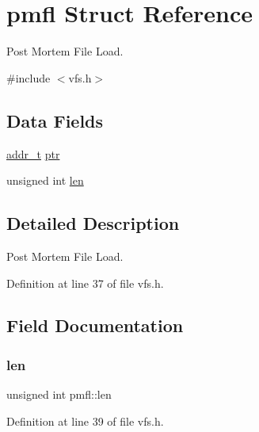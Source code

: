 \hypertarget{a00310}{}\section{pmfl Struct Reference}
\label{a00310}


Post Mortem File Load.  




{\ttfamily \#include $<$vfs.\+h$>$}

\subsection*{Data Fields}
\begin{DoxyCompactItemize}
\item 
\hyperlink{a00134_a295f71165288684c38c6bb836fbb3c59_a295f71165288684c38c6bb836fbb3c59}{addr\+\_\+t} \hyperlink{a00310_ac769ba8a7086d818e1137ce59dd21077_ac769ba8a7086d818e1137ce59dd21077}{ptr}
\item 
unsigned int \hyperlink{a00310_a151dcc6387f9c9186b4b84526c3a89ff_a151dcc6387f9c9186b4b84526c3a89ff}{len}
\end{DoxyCompactItemize}


\subsection{Detailed Description}
Post Mortem File Load. 

Definition at line 37 of file vfs.\+h.



\subsection{Field Documentation}
\mbox{\label{a00310_a151dcc6387f9c9186b4b84526c3a89ff_a151dcc6387f9c9186b4b84526c3a89ff}} 
\subsubsection{\texorpdfstring{len}{len}}
{\footnotesize\ttfamily unsigned int pmfl\+::len}



Definition at line 39 of file vfs.\+h.

\mbox{\label{a00310_ac769ba8a7086d818e1137ce59dd21077_ac769ba8a7086d818e1137ce59dd21077}} 
